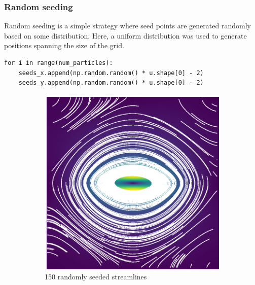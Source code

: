 \documentclass{article}
\begin{document}
\subsubsection{Random seeding}
Random seeding is a simple strategy where seed points are generated randomly based on some distribution.
Here, a uniform distribution was used to generate positions spanning the size of the grid.
\begin{verbatim}
for i in range(num_particles):
    seeds_x.append(np.random.random() * u.shape[0] - 2)
    seeds_y.append(np.random.random() * u.shape[0] - 2)
\end{verbatim}

\newpage

\begin{figure}[h!]
    \centering
    \begin{subfigure}{0.65\textwidth}
        \centering
        \includegraphics[width=\textwidth]{metsim_random_150.eps}
        \caption{150 randomly seeded streamlines}
    \end{subfigure}
    \hfill
    \hfill
    \begin{subfigure}{0.65\textwidth}
        \centering

\end{subfigure}
\end{figure}
\end{document}

